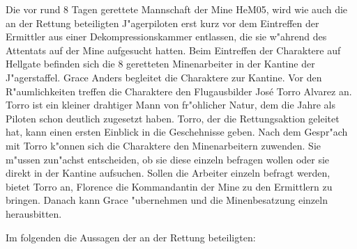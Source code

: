 
Die vor rund 8 Tagen gerettete Mannschaft der Mine HeM05, wird wie auch die an der Rettung beteiligten J"agerpiloten erst kurz vor dem Eintreffen der Ermittler aus einer Dekompressionskammer entlassen, die sie w"ahrend des Attentats auf der Mine aufgesucht hatten. Beim Eintreffen der Charaktere auf Hellgate befinden sich die 8 geretteten Minenarbeiter in der Kantine der J"agerstaffel. Grace Anders begleitet die Charaktere zur Kantine. Vor den R"aumlichkeiten treffen die Charaktere den Flugausbilder Jos\'{e} \frqq{}Torro\flqq{} Alvarez an. Torro ist ein kleiner drahtiger Mann von fr"ohlicher Natur, dem die Jahre als Piloten schon deutlich zugesetzt haben. Torro, der die Rettungsaktion geleitet hat, kann einen ersten Einblick in die Geschehnisse geben. Nach dem Gespr"ach mit Torro k"onnen sich die Charaktere den Minenarbeitern zuwenden. Sie m"ussen zun"achst entscheiden, ob sie diese einzeln befragen wollen oder sie direkt in der Kantine aufsuchen. Sollen die Arbeiter einzeln befragt werden, bietet Torro an, Florence die Kommandantin der Mine zu den Ermittlern zu bringen. Danach kann Grace "ubernehmen und die Minenbesatzung einzeln herausbitten.

Im folgenden die Aussagen der an der Rettung beteiligten:

